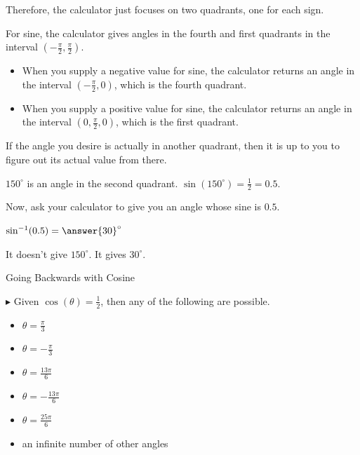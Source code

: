 \documentclass{ximera}
\begin{document}
Therefore, the calculator just focuses on two quadrants, one for each sign. 


For sine, the calculator gives angles in the fourth and first quadrants in the interval $\left( -\frac{\pi}{2}, \frac{\pi}{2}  \right)$. 

\begin{itemize}
\item When you supply a negative value for sine, the calculator returns an angle in the interval $\left( -\frac{\pi}{2}, 0 \right)$, which is the fourth quadrant.
\item When you supply a positive value for sine, the calculator returns an angle in the interval $\left( 0, \frac{\pi}{2}, 0 \right)$, which is the first quadrant.
\end{itemize}


If the angle you desire is actually in another quadrant, then it is up to you to figure out its actual value from there.







\begin{question} 

$150^{\circ}$ is an angle in the second quadrant. $\sin(150^{\circ}) = \frac{1}{2} = 0.5$.


Now, ask your calculator to give you an angle whose sine is $0.5$.


$\sin^{-1}(0.5) = \answer{30}^{\circ}$


It doesn't give $150^{\circ}$.  It gives $30^{\circ}$.

\end{question}














\begin{example} Going Backwards with Cosine

$\blacktriangleright$ Given  $\cos(\theta) = \frac{1}{2}$, then any of the following are possible.


\begin{itemize}
\item $\theta = \frac{\pi}{3}$
\item $\theta = -\frac{\pi}{3}$
\item $\theta = \frac{13\pi}{6}$
\item $\theta = -\frac{13\pi}{6}$
\item $\theta = \frac{25\pi}{6}$
\item an infinite number of other angles
\end{itemize}


\end{example}
\end{document}
